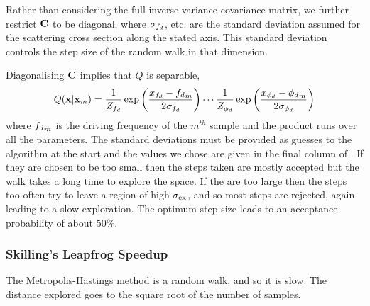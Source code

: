 Rather than considering the full inverse variance-covariance matrix,
we further restrict $\mathbf{C}$ to be diagonal, 
where $\sigma_{f_d}$, etc. are the standard deviation assumed for the scattering cross section along the stated axis.
This standard deviation controls the step size of the random walk in that dimension.

Diagonalising $\mathbf{C}$ implies that $Q$ is separable,
\begin{align}
Q(\mathbf{x}|\mathbf{x}_m) =\frac{1}{Z_{{f_d}}}\exp\left( \frac{x_{{f_d}}-{f_d}_m}{2\sigma_{{f_d}}} \right)\cdots
\frac{1}{Z_{{\phi_d}}}\exp\left( \frac{x_{{\phi_d}}-{\phi_d}_m}{2\sigma_{{\phi_d}}} \right)
\end{align}
where ${f_d}_m$ is the driving frequency of the $m^{th}$ sample and the product runs over all the parameters.
The standard deviations must be provided as guesses to the algorithm at the start
and the values we chose are given in the final column of .
If they are chosen to be too small then the steps taken are mostly accepted but the walk takes a long time to explore the space.
If the are too large then the steps too often try to leave a region of high $\sigma_\textrm{ex}$, and so most steps 
are rejected, again leading to a slow exploration.
The optimum step size leads to an acceptance probability of about $50\%$.





\subsubsection{Skilling's Leapfrog Speedup}
The Metropolis-Hastings method is a random walk, and so it is slow.
The distance explored goes to the square root of the number of samples.


